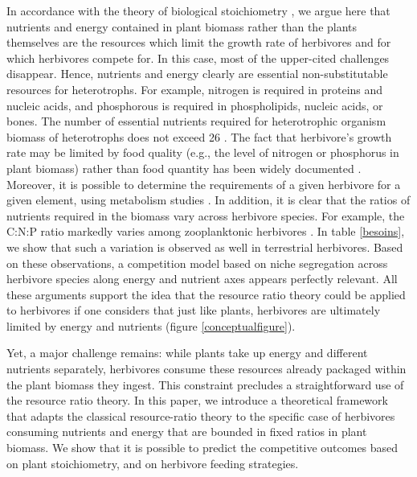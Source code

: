 \documentclass[12pt]{article}
\begin{document}
In accordance with the theory of biological stoichiometry \citep{sterner2002}, we argue here that nutrients and energy contained in plant biomass rather than the plants themselves are the resources which limit the growth rate of herbivores and for which herbivores compete for. In this case, most of the upper-cited challenges disappear. Hence, nutrients and energy  clearly are essential non-substitutable resources for heterotrophs. For example, nitrogen is required in proteins and nucleic acids, and phosphorous is required in phospholipids, nucleic acids, or bones. The number of essential nutrients required for heterotrophic organism biomass of heterotrophs does not exceed 26 \citep{sterner2002}. The fact that herbivore's growth rate may be limited by food quality (e.g., the level of nitrogen or phosphorus in plant biomass) rather than food quantity has been widely documented \citep{Sterner1992, Hessen1992, Urabe1992}. Moreover, it is possible  to determine the requirements of a given herbivore for a given element, using metabolism studies \citep{Mould1981}. In addition, it is clear that the ratios of nutrients required in the biomass vary across herbivore species. For example, the C:N:P ratio markedly varies among zooplanktonic herbivores \citep{Andersen1991, Sterner1992}. 
In table \ref{besoins}, we show that such a variation is observed as well in terrestrial herbivores. 
Based on these observations, a competition model based on niche segregation across herbivore species along energy and nutrient axes appears perfectly relevant. All these arguments support the idea that the resource ratio theory could be applied to herbivores if one considers that just like plants, herbivores are ultimately limited by energy and nutrients (figure \ref{conceptualfigure}). \par 

Yet, a major challenge remains: while plants take up energy and different nutrients separately, herbivores consume these resources already packaged within the plant biomass they ingest. This constraint precludes a straightforward use of the resource ratio theory. 
In this paper, we introduce a theoretical framework that adapts  the classical resource-ratio theory to the specific case of herbivores consuming nutrients  and energy  that are bounded in fixed ratios in plant biomass. We show that it is possible to predict the competitive outcomes based on  plant  stoichiometry, and on herbivore feeding strategies. %
 
\end{document}
